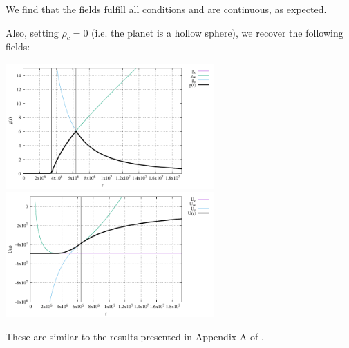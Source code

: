 We find that the fields fulfill all conditions and are continuous, as expected.

Also, setting $\rho_c=0$ (i.e. the planet is a hollow sphere), 
we recover the following fields:
\begin{center}
\includegraphics[width=8cm]{images/gravity_benchmark2/g0.pdf}
\includegraphics[width=8cm]{images/gravity_benchmark2/U0.pdf}
\end{center}

These are similar to the results presented in Appendix A of \textcite{thie18}.




